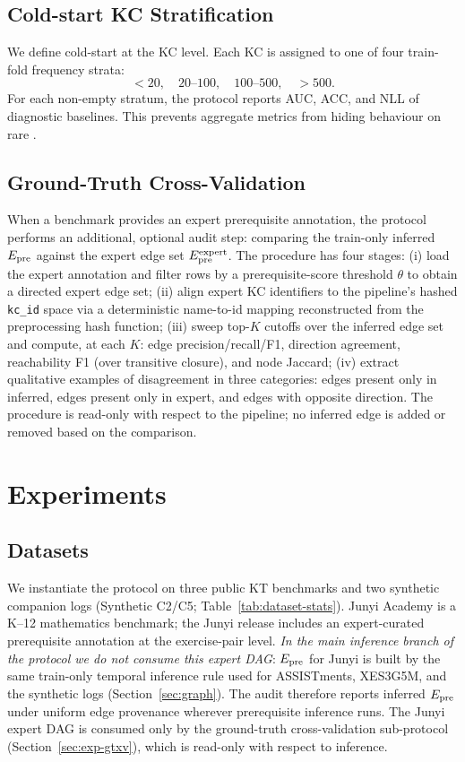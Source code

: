 \subsection{Cold-start KC Stratification}
\label{sec:cold-start}
We define cold-start at the KC level. Each KC is assigned to one of four
train-fold frequency strata:
\[
<20,\quad 20\text{--}100,\quad 100\text{--}500,\quad >500.
\]
For each non-empty stratum, the protocol reports AUC, ACC, and NLL of
diagnostic baselines. This prevents aggregate metrics from hiding
behaviour on rare \KCs{}.
\subsection{Ground-Truth Cross-Validation}
\label{sec:gtxv-protocol}
When a benchmark provides an expert prerequisite annotation, the
protocol performs an additional, optional audit step: comparing the
train-only inferred $E_{\text{pre}}$ against the expert edge set
$E_{\text{pre}}^{\text{expert}}$. The procedure has four stages:
(i) load the expert annotation and filter rows by a prerequisite-score
threshold $\theta$ to obtain a directed expert edge set;
(ii) align expert KC identifiers to the pipeline's hashed \texttt{kc\_id}
space via a deterministic name-to-id mapping reconstructed from the
preprocessing hash function;
(iii) sweep top-$K$ cutoffs over the inferred edge set and compute,
at each $K$: edge precision/recall/F1, direction agreement, reachability
F1 (over transitive closure), and node Jaccard;
(iv) extract qualitative examples of disagreement in three categories:
edges present only in inferred, edges present only in expert, and edges
with opposite direction.
The procedure is read-only with respect to the pipeline; no
inferred edge is added or removed based on the comparison.
\section{Experiments}
\label{sec:exp}
\subsection{Datasets}
\label{sec:datasets}
We instantiate the protocol on three public KT benchmarks and two
synthetic companion logs (Synthetic C2/C5; Table~\ref{tab:dataset-stats}). Junyi Academy
\cite{junyi_dataset} is a K--12 mathematics benchmark; the Junyi release
includes an expert-curated prerequisite annotation at the
exercise-pair level. \emph{In the main inference branch of the protocol
we do not consume this expert DAG}: $E_{\text{pre}}$ for Junyi is built by the
same train-only temporal inference rule used for ASSISTments,
XES3G5M, and the synthetic logs (Section~\ref{sec:graph}). The audit therefore reports inferred
$E_{\text{pre}}$ under uniform edge provenance wherever prerequisite inference runs. The
Junyi expert DAG is consumed only by the ground-truth cross-validation
sub-protocol (Section~\ref{sec:exp-gtxv}), which is read-only with
respect to inference.

